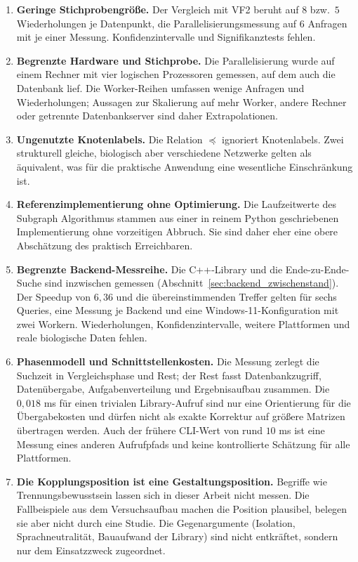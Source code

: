 \documentclass[a4paper,12pt, twoside]{report}
\theoremstyle{definition}
\begin{document}
\begin{enumerate}
	\item \textbf{Geringe Stichprobengröße.} Der Vergleich mit VF2 beruht auf $8$ bzw.\ $5$ Wiederholungen je Datenpunkt, die Parallelisierungsmessung auf $6$ Anfragen mit je einer Messung. Konfidenzintervalle und Signifikanztests fehlen.
	\item \textbf{Begrenzte Hardware und Stichprobe.} Die Parallelisierung wurde auf einem Rechner mit vier logischen Prozessoren gemessen, auf dem auch die Datenbank lief. Die Worker-Reihen umfassen wenige Anfragen und Wiederholungen; Aussagen zur Skalierung auf mehr Worker, andere Rechner oder getrennte Datenbankserver sind daher Extrapolationen.
	\item \textbf{Ungenutzte Knotenlabels.} Die Relation $\preceq$ ignoriert Knotenlabels. Zwei strukturell gleiche, biologisch aber verschiedene Netzwerke gelten als äquivalent, was für die praktische Anwendung eine wesentliche Einschränkung ist.
	\item \textbf{Referenzimplementierung ohne Optimierung.} Die Laufzeitwerte des Subgraph Algorithmus stammen aus einer in reinem Python geschriebenen Implementierung ohne vorzeitigen Abbruch. Sie sind daher eher eine obere Abschätzung des praktisch Erreichbaren.
	\item \textbf{Begrenzte Backend-Messreihe.} Die C++-Library und die Ende-zu-Ende-Suche sind inzwischen gemessen (Abschnitt~\ref{sec:backend_zwischenstand}). Der Speedup von $6{,}36$ und die übereinstimmenden Treffer gelten für sechs Queries, eine Messung je Backend und eine Windows-11-Konfiguration mit zwei Workern. Wiederholungen, Konfidenzintervalle, weitere Plattformen und reale biologische Daten fehlen.
	\item \textbf{Phasenmodell und Schnittstellenkosten.} Die Messung zerlegt die Suchzeit in Vergleichsphase und Rest; der Rest fasst Datenbankzugriff, Datenübergabe, Aufgabenverteilung und Ergebnisaufbau zusammen. Die $0{,}018$ ms für einen trivialen Library-Aufruf sind nur eine Orientierung für die Übergabekosten und dürfen nicht als exakte Korrektur auf größere Matrizen übertragen werden. Auch der frühere CLI-Wert von rund $10$ ms ist eine Messung eines anderen Aufrufpfads und keine kontrollierte Schätzung für alle Plattformen.
	\item \textbf{Die Kopplungsposition ist eine Gestaltungsposition.} Begriffe wie Trennungsbewusstsein lassen sich in dieser Arbeit nicht messen. Die Fallbeispiele aus dem Versuchsaufbau machen die Position plausibel, belegen sie aber nicht durch eine Studie. Die Gegenargumente (Isolation, Sprachneutralität, Bauaufwand der Library) sind nicht entkräftet, sondern nur dem Einsatzzweck zugeordnet.

\end{enumerate}
\end{document}
